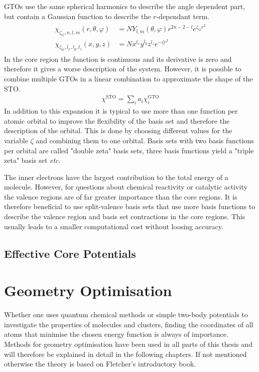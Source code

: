 \acp{GTO} use the same spherical harmonics to describe the angle dependent
part, but contain a Gaussian function to describe the $r$-dependant term.
%
\begin{align}
    \begin{aligned}
    \chi_{\zeta_G,n,l,m}(r,\theta,\varphi) &= NY_{l,m}(\theta,\varphi)r^{2n-2-l}e^{\zeta_Gr^2}\\
    \chi_{\zeta_G,l_x,l_y,l_z}(x,y,z) &= N x^{l_x}y^{l_y}z^{l_z}e^{-\zeta r^2}
    \end{aligned}
\end{align}
%
In the core region the function is continuous and its derivative is zero and
therefore it gives a worse description of the system. However, it is possible
to combine multiple \acp{GTO} in a linear combination to approximate the shape
of the \ac{STO}.
%
\begin{align}
    \chi^\text{STO} = \sum_ia_i\chi_i^\text{GTO}
\end{align}
%
In addition to this expansion it is typical to use more than one
function per atomic orbital to improve the flexibility of the basis set and
therefore the description of the orbital. This is done by choosing different
values for the variable $\zeta$ and combining them to one orbital. Basis sets
with two basis functions per orbital are called "double zeta" basis sets, three
basis functions yield a "triple zeta" basis set \textit{etc}.

The inner electrons have the largest contribution to the total energy of a
molecule. However, for questions about chemical reactivity or catalytic
activity the valence regions are of far greater importance than the core
regions. It is therefore beneficial to use split-valence basis sets that use
more basis functions to describe the valence region and basis set contractions
in the core regions. This usually leads to a smaller computational cost without
loosing accuracy. 

\section{Effective Core Potentials}
\label{sec:ECP}



\chapter{Geometry Optimisation}
\label{sec:geometryoptimisation}

Whether one uses quantum chemical methods or simple two-body potentials to
investigate the properties of molecules and clusters, finding the coordinates
of all atoms that minimise the chosen energy function is always of importance.
Methods for geometry optimisation have been used in all parts of this thesis
and will therefore be explained in detail in the following chapters. If not
mentioned otherwise the theory is based on
Fletcher's\autocite{Fletcher_Practicalmethodsoptimization_1987} introductory
book.

